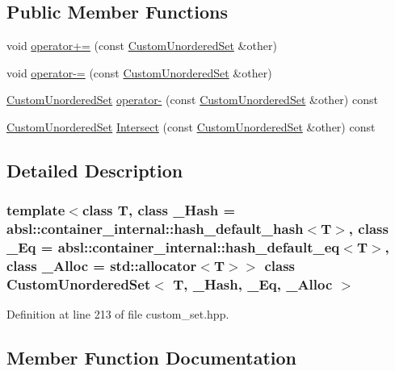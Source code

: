 \subsection*{Public Member Functions}
\begin{DoxyCompactItemize}
\item 
void \hyperlink{classCustomUnorderedSet_a74c13a391ad5c035a30d168889f5bb94}{operator+=} (const \hyperlink{classCustomUnorderedSet}{Custom\+Unordered\+Set} \&other)
\item 
void \hyperlink{classCustomUnorderedSet_a7ea2ed096ab2af0dc8bcdb50b2b58f61}{operator-\/=} (const \hyperlink{classCustomUnorderedSet}{Custom\+Unordered\+Set} \&other)
\item 
\hyperlink{classCustomUnorderedSet}{Custom\+Unordered\+Set} \hyperlink{classCustomUnorderedSet_af4a229addefcc76c561f128b7dfc2425}{operator-\/} (const \hyperlink{classCustomUnorderedSet}{Custom\+Unordered\+Set} \&other) const
\item 
\hyperlink{classCustomUnorderedSet}{Custom\+Unordered\+Set} \hyperlink{classCustomUnorderedSet_a97b6fbc663b420625abab12dfb3126d7}{Intersect} (const \hyperlink{classCustomUnorderedSet}{Custom\+Unordered\+Set} \&other) const
\end{DoxyCompactItemize}


\subsection{Detailed Description}
\subsubsection*{template$<$class T, class \+\_\+\+Hash = absl\+::container\+\_\+internal\+::hash\+\_\+default\+\_\+hash$<$\+T$>$, class \+\_\+\+Eq = absl\+::container\+\_\+internal\+::hash\+\_\+default\+\_\+eq$<$\+T$>$, class \+\_\+\+Alloc = std\+::allocator$<$\+T$>$$>$\newline
class Custom\+Unordered\+Set$<$ T, \+\_\+\+Hash, \+\_\+\+Eq, \+\_\+\+Alloc $>$}



Definition at line 213 of file custom\+\_\+set.\+hpp.



\subsection{Member Function Documentation}
\mbox{\label{classCustomUnorderedSet_a97b6fbc663b420625abab12dfb3126d7}} 
